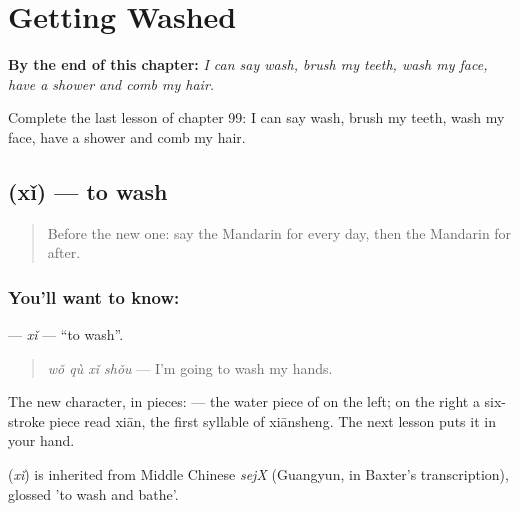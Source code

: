 
\chapter{Getting Washed}
\label{ch:zh-getting-washed}

\begin{chapteropening}
\textbf{By the end of this chapter:} \emph{I can say wash, brush my teeth, wash my face, have a shower and comb my hair.}

Complete the last lesson of chapter 99: I can say wash, brush my teeth, wash my face, have a shower and comb my hair.
\end{chapteropening}

\section[\texorpdfstring{\zh{洗} (xǐ)}{洗 (xǐ)}]{ (xǐ) — to wash}

\label{lesson:ZH-C99-xi}



\begin{quote}
Before the new one: say the Mandarin for every day, then the Mandarin for after.
\end{quote}

\subsection*{You'll want to know: }
\textbf{} — \emph{xǐ} — \textquotedblleft{}to wash\textquotedblright{}.

\begin{quote}
\textbf{} \emph{wǒ qù xǐ shǒu} — I'm going to wash my hands.
\end{quote}

The new character, in pieces:  — the water piece of  on the left; on the right a six-stroke piece read xiān, the first syllable of xiānsheng. The next lesson puts it in your hand.

\begin{cousinweb}
\textbf{} (\emph{xǐ}) is inherited from Middle Chinese \emph{sejX} (Guangyun, in Baxter's transcription), glossed 'to wash and bathe'.
\end{cousinweb}


